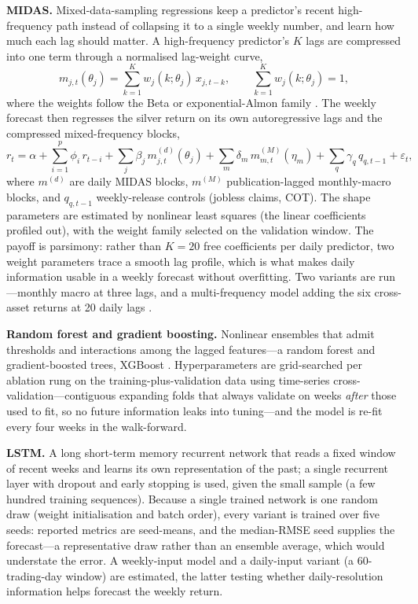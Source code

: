\documentclass[12pt, a4paper]{article}
\begin{document}
\textbf{MIDAS.} Mixed-data-sampling regressions keep a predictor's recent high-frequency
path instead of collapsing it to a single weekly number, and learn how much each lag
should matter. A high-frequency predictor's \(K\) lags are compressed into one term through
a normalised lag-weight curve,
\begin{equation}
    m_{j,t}(\theta_j) = \sum_{k=1}^{K} w_j(k;\theta_j)\, x_{j,t-k},
    \qquad \sum_{k=1}^{K} w_j(k;\theta_j) = 1,
\end{equation}
where the weights follow the Beta or exponential-Almon family
\parencite{ghysels2004,ghysels2007}. The weekly forecast then regresses the silver return
on its own autoregressive lags and the compressed mixed-frequency blocks,
\begin{equation}
    r_t = \alpha + \sum_{i=1}^{p}\phi_i\, r_{t-i}
    + \sum_{j} \beta_j\, m_{j,t}^{(d)}(\theta_j)
    + \sum_{m} \delta_m\, m_{m,t}^{(M)}(\eta_m)
    + \sum_{q} \gamma_q\, q_{q,t-1}
    + \varepsilon_t ,
\end{equation}
where \(m^{(d)}\) are daily MIDAS blocks, \(m^{(M)}\) publication-lagged monthly-macro
blocks, and \(q_{q,t-1}\) weekly-release controls (jobless claims, COT). The shape
parameters are estimated by nonlinear least squares (the linear coefficients profiled
out), with the weight family selected on the validation window. The payoff is parsimony:
rather than \(K=20\) free coefficients per daily predictor, two weight parameters trace a
smooth lag profile, which is what makes daily information usable in a weekly forecast
without overfitting. Two variants are run---monthly macro at three lags, and a
multi-frequency model adding the six cross-asset returns at 20 daily lags
\parencite{andreou2013}.

\textbf{Random forest and gradient boosting.} Nonlinear ensembles that admit thresholds
and interactions among the lagged features---a random forest \parencite{breiman2001} and
gradient-boosted trees, XGBoost \parencite{chen2016}. Hyperparameters are grid-searched per
ablation rung on the training-plus-validation data using time-series cross-validation---contiguous
expanding folds that always validate on weeks \emph{after} those used to fit, so no future
information leaks into tuning---and the model is re-fit every four weeks in the walk-forward.

\textbf{LSTM.} A long short-term memory recurrent network \parencite{hochreiter1997} that
reads a fixed window of recent weeks and learns its own representation of the past; a
single recurrent layer with dropout and early stopping is used, given the small sample (a
few hundred training sequences). Because a single trained network is one random draw
(weight initialisation and batch order), every variant is trained over five seeds:
reported metrics are seed-means, and the median-RMSE seed supplies the forecast---a
representative draw rather than an ensemble average, which would understate the error.
A weekly-input model and a daily-input variant (a
60-trading-day window) are estimated, the latter testing whether daily-resolution
information helps forecast the weekly return.
\end{document}

